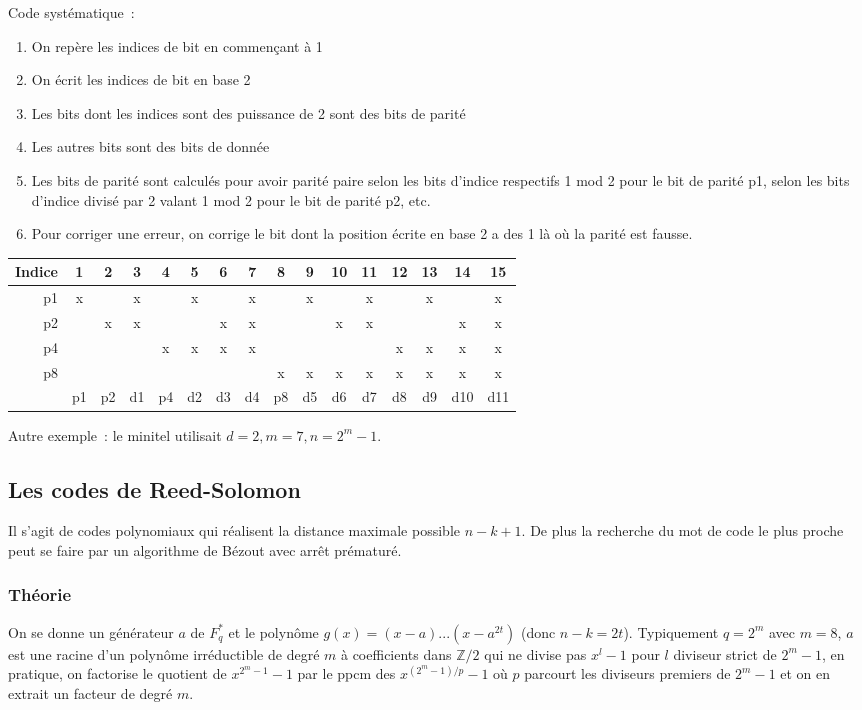 \documentclass[a4paper,11pt]{article}
\newcommand{\Z}{{\mathbb{Z}}}
\begin{document}
Code syst\'ematique~: 
\begin{enumerate}
\item On rep\`ere les indices de bit en commen\c{c}ant
\`a 1
\item On \'ecrit les indices de bit en base 2
\item Les bits dont les indices sont des puissance de 2
sont des bits de parit\'e
\item Les autres bits sont des bits de donn\'ee
\item Les bits de parit\'e sont calcul\'es pour avoir parit\'e
paire selon les bits d'indice respectifs 1 mod 2 pour le bit de
parit\'e p1, selon les bits d'indice divis\'e par 2 valant 1 mod 2 pour le bit de parit\'e p2, etc.
\item Pour corriger une erreur, on corrige le bit dont la position
\'ecrite en base 2 a des 1 l\`a o\`u la parit\'e est fausse.
\end{enumerate}
\begin{tabular}{|r|ccccccccccccccc|} \hline 
Indice & 1 & 2 & 3 & 4 & 5 & 6 & 7 & 8 & 9 & 10 & 11 & 12 & 13 & 14 & 15 \\ \hline
p1     &  x &   & x &   & x  &    & x  &   & x &     &  x   &    & x  &  & x \\
p2     &     & x & x & &     & x  & x &    &    & x  & x    &   &    & x & x \\
p4     &     &    &    & x & x& x& x&      &    &     &       & x& x& x& x \\
p8      &    &    &    &    &    &   &  & x   & x & x  & x   & x & x & x & x \\
\hline 
& p1 & p2 & d1 & p4 & d2 & d3 & d4 & p8 & d5 & d6 & d7 & d8 & d9 & d10 & d11 \\
\hline 
\end{tabular}

Autre exemple~: le minitel utilisait $d=2, m=7, n=2^m-1$.

\subsection{Les codes de Reed-Solomon}
Il s'agit de codes polynomiaux qui r\'ealisent la distance maximale
possible $n-k+1$. De plus la recherche du mot de code le plus
proche peut se faire par un algorithme de B\'ezout avec arr\^et 
pr\'ematur\'e.

\subsubsection{Théorie}
On se donne un g\'en\'erateur $a$ 
de $F_q^*$ et le polyn\^ome $g(x)=(x-a)...(x-a^{2t})$ (donc $n-k=2t$). 
Typiquement $q=2^m$ avec $m=8$, 
$a$ est une racine d'un polyn\^ome irr\'eductible
de degr\'e $m$ à coefficients dans $\Z/2$ 
qui ne divise pas $x^l-1$ pour $l$ diviseur
strict de $2^m-1$, en pratique, on factorise le quotient de $x^{2^m-1}-1$
par le ppcm des $x^{(2^m-1)/p}-1$ o\`u $p$ parcourt les
diviseurs premiers de $2^m-1$ et on en extrait un facteur de degr\'e $m$.
\end{document}
